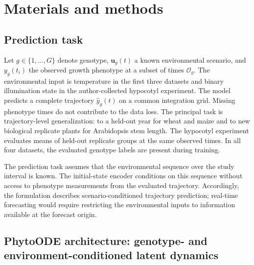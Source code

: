 \documentclass[preprint,12pt,authoryear]{elsarticle}
\newcommand{\model}{PhytoODE}
\begin{document}
\section{Materials and methods}
\label{sec:methods}

\subsection{Prediction task}

Let $g\in\{1,\ldots,G\}$ denote genotype, $\mathbf u_g(t)$ a known environmental scenario, and $y_g(t_i)$ the observed growth phenotype at a subset of times $\mathcal{O}_g$. The environmental input is temperature in the first three datasets and binary illumination state in the author-collected hypocotyl experiment. The model predicts a complete trajectory $\hat y_g(t)$ on a common integration grid. Missing phenotype times do not contribute to the data loss. The principal task is trajectory-level generalization: to a held-out year for wheat and maize and to new biological replicate plants for Arabidopsis stem length. The hypocotyl experiment evaluates means of held-out replicate groups at the same observed times. In all four datasets, the evaluated genotype labels are present during training.

The prediction task assumes that the environmental sequence over the study interval is known. The initial-state encoder conditions on this sequence without access to phenotype measurements from the evaluated trajectory. Accordingly, the formulation describes scenario-conditioned trajectory prediction; real-time forecasting would require restricting the environmental inputs to information available at the forecast origin.

\subsection{\model{} architecture: genotype- and environment-conditioned latent dynamics}
\end{document}
